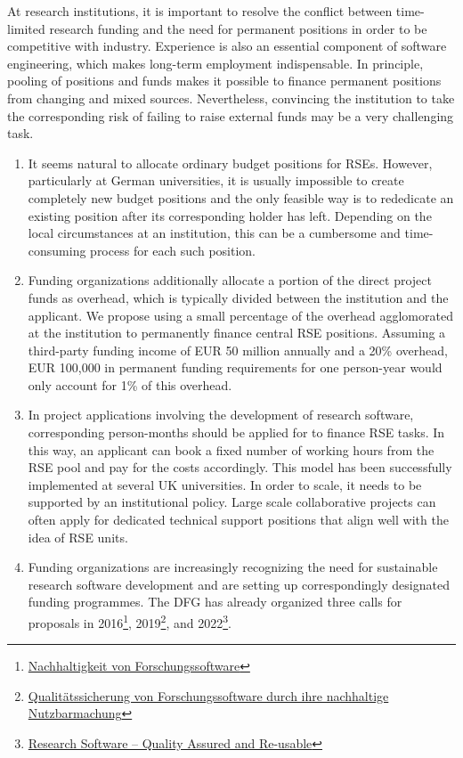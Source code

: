 \documentclass[a4paper]{article}
\begin{document}
At research institutions, it is important to resolve the conflict between time-limited research funding and the need for permanent positions in order to be competitive with industry.
Experience is also an essential component of software engineering, which makes long-term employment indispensable.
In principle, pooling of positions and funds makes it possible to finance permanent positions from changing and mixed sources.
Nevertheless, convincing the institution to take the corresponding risk of failing to raise external funds may be a very challenging task.
\begin{enumerate}
\item It seems natural to allocate ordinary budget positions for RSEs.
      However, particularly at German universities, it is usually impossible to create completely new budget positions and the only feasible way is to rededicate an existing position after its corresponding holder has left.
      Depending on the local circumstances at an institution, this can be a cumbersome and time-consuming process for each such position.
\item Funding organizations additionally allocate a portion of the direct project funds as overhead, which is typically divided between the institution and the applicant.
      We propose using a small percentage of the overhead agglomorated at the institution to permanently finance central RSE positions.
      Assuming a third-party funding income of EUR 50 million annually and a 20\% overhead, EUR 100,000 in permanent funding requirements for one person-year would only account for 1\% of this overhead.
\item In project applications involving the development of research software, corresponding person-months should be applied for to finance RSE tasks.
      In this way, an applicant can book a fixed number of working hours from the RSE pool and pay for the costs accordingly.
      This model has been successfully implemented at several UK universities.
      In order to scale, it needs to be supported by an institutional policy.
      Large scale collaborative projects can often apply for dedicated technical support positions that align well with the idea of RSE units.
\item Funding organizations are increasingly recognizing the need for sustainable research software
      development and are setting up correspondingly designated funding programmes.
      The DFG has already organized three calls for proposals in 2016\footnote{\href{https://www.dfg.de/resource/blob/172674/1bcb181a6451fdac9d94421776b52798/161026-dfg-ausschreibung-forschungssoftware-de-data.pdf}{Nachhaltigkeit von Forschungssoftware}}, 2019\footnote{\href{https://www.dfg.de/de/aktuelles/neuigkeiten-themen/info-wissenschaft/2019/info-wissenschaft-19-44}{Qualitätssicherung von Forschungssoftware durch ihre nachhaltige Nutzbarmachung}}, and 2022\footnote{\href{https://www.dfg.de/en/news/news-topics/announcements-proposals/2022/info-wissenschaft-22-85}{Research Software – Quality Assured and Re-usable}}.

\end{enumerate}
\end{document}
